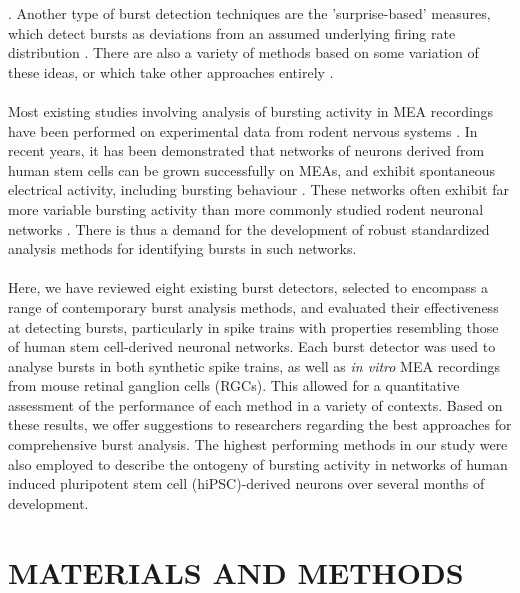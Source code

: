 \documentclass[12pt, titlepage]{article}
\begin{document}
	\cite{Cocatre-Zilgien1992,Selinger2007,Pasquale2010,Kaneoke1996,Bakkum2013,Kapucu2012}.
	 Another type of burst detection techniques are the 'surprise-based' measures, which detect bursts as deviations from an assumed underlying firing rate distribution \cite{Legendy1985,Ko2012,Gourevitch2007}. There are also a variety of methods based on some variation of these ideas, or which take other approaches entirely \cite{Hennig2011,Tokdar2010,Turnbull2005,Tam2002,Xia2003,Wagenaar2005,Weihberger2013}.
	\\ \\ Most existing studies involving analysis of bursting activity in MEA recordings have been performed on experimental data from rodent nervous systems \cite{Charlesworth2015,Mazzoni2007}. In recent years, it has been demonstrated that networks of neurons derived from human stem cells can be grown successfully on MEAs, and exhibit spontaneous electrical activity, including bursting behaviour \cite{Illes2007,Heikkila2009}. %
	These networks often exhibit far more variable bursting activity than more commonly studied rodent neuronal networks \cite{Kapucu2012}.
	There is thus a demand for the development of robust standardized analysis methods for identifying bursts in such networks.
	\\ \\ Here, we have reviewed eight existing burst detectors, selected to encompass a range of contemporary burst analysis methods, and evaluated their effectiveness at detecting bursts, particularly in spike trains with properties resembling those of human stem cell-derived neuronal networks. Each burst detector was used to analyse bursts in both synthetic spike trains, as well as \textit{in vitro} MEA recordings from mouse retinal ganglion cells (RGCs). This allowed for a quantitative assessment of the performance of each method in a variety of contexts. Based on these results, we offer suggestions to researchers regarding the best approaches for comprehensive burst analysis. The highest performing methods in our study were also employed to describe the ontogeny of bursting activity in networks of human induced pluripotent stem cell (hiPSC)-derived neurons over several months of development. 
	\section*{MATERIALS AND METHODS}
\end{document}
